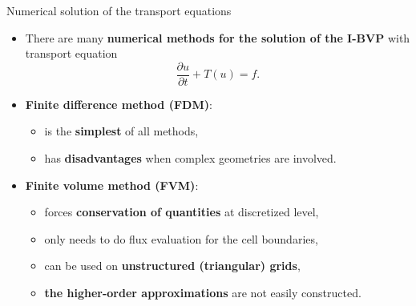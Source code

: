%
%
\begin{frame}{Numerical solution of the transport equations}
\begin{itemize}
\item There are many {\bf numerical methods for the solution of the I-BVP} with transport equation \\[-15pt]
%
\[
\frac{\partial u}{\partial t}+T(u) = f.
\]
%
\vskip -15pt
\pause
\item \alert{\bf Finite difference method (FDM)}:
\begin{itemize}
	\item is the {\bf simplest} of all methods, 
	\item has {\bf disadvantages} when \alert{complex geometries} are involved.
\end{itemize}
%
\pause
\item \alert{\bf Finite volume method (FVM)}:
\begin{itemize}
	\item forces {\bf conservation of quantities} at discretized level, 
	\item only needs to do flux evaluation for the cell boundaries,
	\item can be used on {\bf unstructured (triangular) grids}, 
	\item {\bf the higher-order approximations} are not easily constructed.
\end{itemize}

\end{itemize}
\end{frame}
